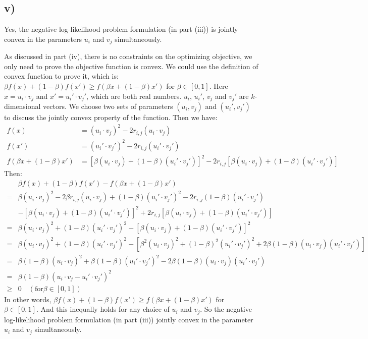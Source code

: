 \documentclass[twoside,11pt]{homework}
\begin{document}
\subsection*{v)}
Yes, the negative log-likelihood problem formulation (in part (iii)) is jointly convex in the parameters $u_i$ and $v_j$ simultaneously.

As discussed in part (iv), there is no constraints on the optimizing objective, we only need to prove the objective function is convex.
We could use the definition of convex function to prove it, which is:
$\beta f(x) + (1-\beta) f(x') \ge f(\beta x + (1-\beta) x')$ for $\beta \in [0, 1]$.
Here $x = u_i \cdot v_j$ and $x' = u_i' \cdot v_j'$, which are both real numbers.
$u_i$, $u_i'$, $v_j$ and $v_j'$ are $k$-dimensional vectors.
We choose two sets of parameters $(u_i, v_j)$ and $(u_i', v_j')$ to discuss the jointly convex property of the function.
Then we have:
%
\begin{equation}
\begin{split}
f(x) &=  (u_i \cdot v_j)^2 - 2r_{i, j} (u_i \cdot v_j) \\
f(x') &=  (u_i' \cdot v_j')^2 - 2r_{i, j} (u_i' \cdot v_j') \\
f(\beta x + (1-\beta) x') &= [\beta (u_i \cdot v_j) + (1-\beta) (u_i' \cdot v_j')]^2 - 2 r_{i, j}[\beta (u_i \cdot v_j) + (1-\beta) (u_i' \cdot v_j')]
\end{split}
\end{equation}
%
Then:
%
\begin{equation}
\begin{split}
&\beta f(x) + (1-\beta) f(x') - f(\beta x + (1-\beta) x') \\
=& \beta (u_i \cdot v_j)^2 - 2\beta r_{i, j} (u_i \cdot v_j) +  (1-\beta) (u_i' \cdot v_j')^2 - 2r_{i, j}(1-\beta)  (u_i' \cdot v_j') \\
&- [\beta (u_i \cdot v_j) + (1-\beta) (u_i' \cdot v_j')]^2 + 2 r_{i, j}[\beta (u_i \cdot v_j) + (1-\beta) (u_i' \cdot v_j')] \\
=& \beta (u_i \cdot v_j)^2 + (1-\beta) (u_i' \cdot v_j')^2 - [\beta (u_i \cdot v_j) + (1-\beta) (u_i' \cdot v_j')]^2 \\
=& \beta (u_i \cdot v_j)^2 + (1-\beta) (u_i' \cdot v_j')^2 - [\beta^2 (u_i \cdot v_j)^2 + (1-\beta)^2 (u_i' \cdot v_j')^2 + 2\beta (1-\beta)(u_i \cdot v_j) (u_i' \cdot v_j') ] \\
=& \beta (1-\beta) (u_i \cdot v_j)^2 + \beta (1-\beta)(u_i' \cdot v_j')^2 - 2\beta (1-\beta)(u_i \cdot v_j) (u_i' \cdot v_j') \\
=& \beta (1-\beta) (u_i \cdot v_j - u_i' \cdot v_j')^2 \\
\ge & 0 \quad (\mathrm{for} \beta \in [0, 1])
\end{split}
\end{equation}
%
In other words, $\beta f(x) + (1-\beta) f(x') \ge f(\beta x + (1-\beta) x')$ for $\beta \in [0, 1]$.
And this inequally holds for any choice of $u_i$ and $v_j$.
So the negative log-likelihood problem formulation (in part (iii)) jointly convex in the parameter $u_i$ and $v_j$ simultaneously.
\end{document}
